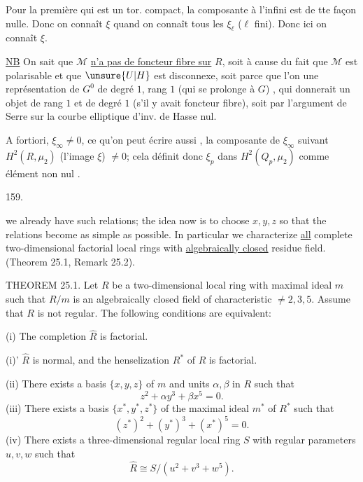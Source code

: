 Pour la première qui est un tor. compact, la composante à l'infini est de tte façon nulle. Donc on connaît $\xi$ quand on connaît tous les $\xi_\ell$ ($\ell$ fini). Donc ici on  connaît $\xi$.

\uline{NB} On sait  que $\mathcal M$ \uline{n'a pas de foncteur fibre sur} $R$,  soit à cause du fait que $\mathcal M$ est polarisable et que $\unsure{U|H}$ est disconnexe, soit parce que l'on   une représentation de $G^0$ de degré $1$, rang $1$ (qui se prolonge à $G$)  , qui donnerait un objet de  rang $1$ et de degré $1$ (s'il y avait foncteur fibre), soit par l'argument de Serre sur la courbe elliptique d'inv. de Hasse nul.

A fortiori, $\xi_\infty\ne0$, ce qu'on peut écrire aussi , la composante de $\xi_\infty$ suivant $H^2(R,\mu_2)$  (l'image   $\xi$) $\ne0$; cela définit donc  $\xi_p$  dans $H^2(Q_p,\mu_2)$ comme  élément non nul .

159.

we already have such relations; the idea now is to choose $x,y,z$ so that the relations become as simple as possible. In particular we characterize \uline{all} complete two-dimensional factorial local rings with \uline{algebraically closed} residue field. (Theorem 25.1, Remark 25.2).

THEOREM 25.1. Let $R$ be a two-dimensional local ring with maximal ideal $m$ such that $R/m$ is an algebraically closed field of characteristic $\ne2,3,5$. Assume that $R$ is not regular. The following conditions are equivalent:

(i) The completion $\widehat R$ is factorial.

(i)' $\widehat R$ is normal, and the henselization $R^*$ of $R$ is factorial.

(ii) There exists a basis $\{x,y,z\}$ of $m$ and units $\alpha,\beta$ in $R$ such that
\[
z^2+\alpha y^3+\beta x^5=0.
\]
(iii) There exists a basis $\{x^*,y^*,z^*\}$ of the maximal ideal $m^*$ of $R^*$ such that
\[
(z^*)^2+(y^*)^3+(x^*)^5=0.
\]
(iv) There exists a three-dimensional regular local ring $S$ with regular parameters $u,v,w$ such that
\[
\widehat R\cong S/(u^2+v^3+w^5).
\]


